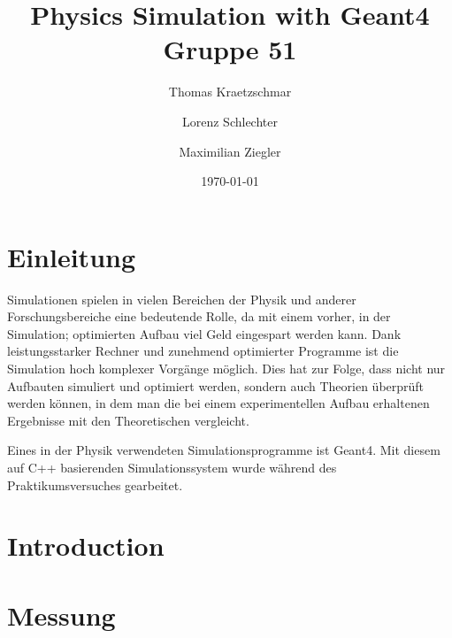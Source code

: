\documentclass[a4paper,14pt,twoside]{article}
\title{%
{\Huge Physics Simulation with Geant4}\\[0.5\baselineskip]
{\normalsize Gruppe 51}
}
\author{%
Thomas Kraetzschmar
\and Lorenz Schlechter
\and Maximilian Ziegler
}
\date{\today}
\begin{document}
\pagestyle{fancy}
\maketitle
\clearpage
\tableofcontents
\clearpage
\pagestyle{fancy}
\section{Einleitung}
Simulationen spielen in vielen Bereichen der Physik und anderer Forschungsbereiche eine bedeutende Rolle, da mit einem vorher, in der Simulation; optimierten Aufbau viel Geld eingespart werden kann. Dank leistungsstarker Rechner und zunehmend optimierter Programme ist die Simulation hoch komplexer Vorgänge möglich. Dies hat zur Folge, dass nicht nur Aufbauten simuliert und optimiert werden, sondern auch Theorien überprüft werden können, in dem man die bei einem experimentellen Aufbau erhaltenen Ergebnisse mit den Theoretischen vergleicht.

Eines in der Physik verwendeten Simulationsprogramme ist Geant4. Mit diesem auf C++ basierenden Simulationssystem wurde während des Praktikumsversuches gearbeitet.

\section{Introduction}

\section{Messung}
\end{document}
